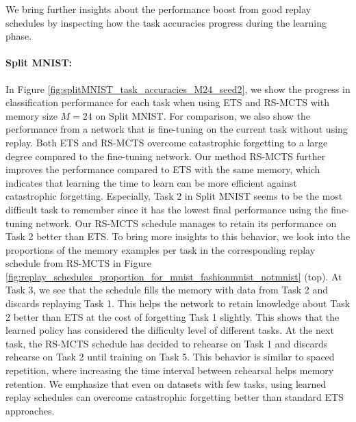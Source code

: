 We bring further insights about the performance boost from good replay schedules by inspecting how the task accuracies progress during the learning phase. 


\vspace{-2mm}
\paragraph{Split MNIST:} In Figure \ref{fig:splitMNIST_task_accuracies_M24_seed2}, we show the progress in classification performance for each task when using ETS and RS-MCTS with memory size $M=24$ on Split MNIST. 
For comparison, we also show the performance from a network that is fine-tuning on the current task without using replay. Both ETS and RS-MCTS overcome catastrophic forgetting to a large degree compared to the fine-tuning network. Our method RS-MCTS further improves the performance compared to ETS with the same memory, which indicates that learning the time to learn can be more efficient against catastrophic forgetting. 
Especially, Task 2 in Split MNIST seems to be the most difficult task to remember since it has the lowest final performance using the fine-tuning network.
Our RS-MCTS schedule manages to retain its performance on Task 2 better than ETS. To bring more insights to this behavior, we look into the proportions of the memory examples per task in the corresponding replay schedule from RS-MCTS in Figure \ref{fig:replay_schedules_proportion_for_mnist_fashionmnist_notmnist} (top). At Task 3, we see that the schedule fills the memory with data from Task 2 and discards replaying Task 1. This helps the network to retain knowledge about Task 2 better than ETS at the cost of forgetting Task 1 slightly. This shows that the learned policy has considered the difficulty level of different tasks. At the next task, the RS-MCTS schedule has decided to rehearse on Task 1 and discards rehearse on Task 2 until training on Task 5. This behavior is similar to spaced repetition, where increasing the time interval between rehearsal helps memory retention. %
We emphasize that even on datasets with few tasks, using learned replay schedules can overcome catastrophic forgetting better than standard ETS approaches.

